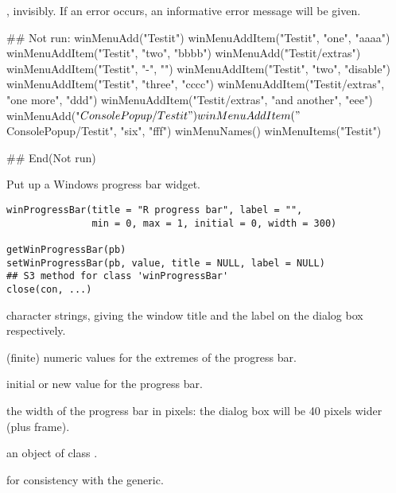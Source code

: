 %
\begin{Value}
, invisibly.  If an error occurs, an informative error
message will be given.
\end{Value}
%
\begin{SeeAlso}\relax
{}
\end{SeeAlso}
%
\begin{Examples}
\begin{ExampleCode}
## Not run: 
winMenuAdd("Testit")
winMenuAddItem("Testit", "one", "aaaa")
winMenuAddItem("Testit", "two", "bbbb")
winMenuAdd("Testit/extras")
winMenuAddItem("Testit", "-", "")
winMenuAddItem("Testit", "two", "disable")
winMenuAddItem("Testit", "three", "cccc")
winMenuAddItem("Testit/extras", "one more", "ddd")
winMenuAddItem("Testit/extras", "and another", "eee")
winMenuAdd("$ConsolePopup/Testit")
winMenuAddItem("$ConsolePopup/Testit", "six", "fff")
winMenuNames()
winMenuItems("Testit")

## End(Not run)
\end{ExampleCode}
\end{Examples}
%
\begin{Description}\relax
Put up a Windows progress bar widget.
\end{Description}
%
\begin{Usage}
\begin{verbatim}
winProgressBar(title = "R progress bar", label = "",
               min = 0, max = 1, initial = 0, width = 300)

getWinProgressBar(pb)
setWinProgressBar(pb, value, title = NULL, label = NULL)
## S3 method for class 'winProgressBar'
close(con, ...)
\end{verbatim}
\end{Usage}
%
\begin{Arguments}
\begin{ldescription}
\item[\code{title, label}] character strings, giving the window title and the
label on the dialog box respectively.
\item[\code{min, max}] (finite) numeric values for the extremes of the
progress bar.
\item[\code{initial, value}] initial or new value for the progress bar.
\item[\code{width}] the width of the progress bar in pixels: the dialog box
will be 40 pixels wider (plus frame).
\item[\code{pb, con}] an object of class .
\item[\code{...}] for consistency with the generic.
\end{ldescription}
\end{Arguments}
